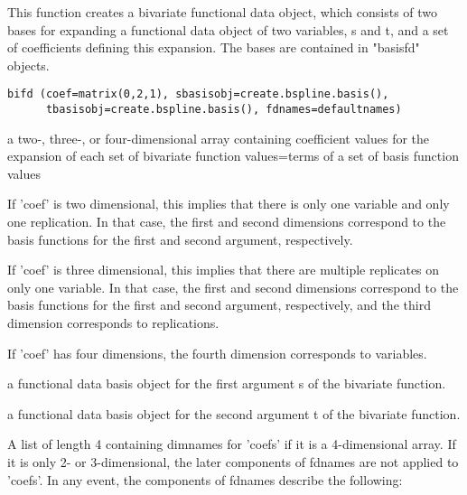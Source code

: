 \documentclass{article}
\begin{document}
\begin{Description}\relax
This function creates a bivariate functional data object, which
consists of two bases for expanding a functional data object of two 
variables, s and t, and a set of coefficients defining this expansion.
The bases are contained in "basisfd" objects.
\end{Description}
\begin{Usage}
\begin{verbatim}
bifd (coef=matrix(0,2,1), sbasisobj=create.bspline.basis(),
      tbasisobj=create.bspline.basis(), fdnames=defaultnames)
\end{verbatim}
\end{Usage}
\begin{Arguments}
\begin{ldescription}
\item[\code{coef}] a two-, three-, or four-dimensional array containing
coefficient values for the expansion of each set of bivariate
function values=terms of a set of basis function values

If 'coef' is two dimensional, this implies that there is only
one variable and only one replication.  In that case, 
the first and second dimensions correspond to
the basis functions for the first and second argument,
respectively.

If 'coef' is three dimensional, this implies that there are multiple
replicates on only one variable.  In that case, 
the first and second dimensions correspond to
the basis functions for the first and second argument,
respectively, and the third dimension corresponds to
replications.

If 'coef' has four dimensions, the fourth dimension
corresponds to variables.

\item[\code{sbasisobj}] a functional data basis object
for the first argument s of the bivariate function.  

\item[\code{tbasisobj}] a functional data basis object
for the second argument t of the bivariate function.  

\item[\code{fdnames}] A list of length 4 containing dimnames for 'coefs' if it is a
4-dimensional array.  If it is only 2- or 3-dimensional, the later
components of fdnames are not applied to 'coefs'.  In any event, the
components of fdnames describe the following:


\end{ldescription}
\end{Arguments}
\end{document}
